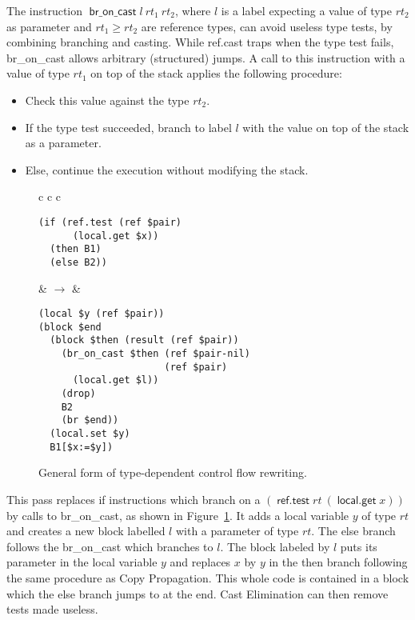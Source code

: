 \documentclass[a4paper,11pt]{article}
\DeclareMathOperator{\broncast}{\textsf{br\_on\_cast}}
\DeclareMathOperator{\reftest}{\textsf{ref.test}}
\DeclareMathOperator{\localget}{\textsf{local.get}}
\begin{document}
The instruction $\broncast l\ rt_1\ rt_2$, where $l$ is a label expecting a
value of type $rt_2$ as parameter and $rt_1\geq rt_2$ are reference types, can
avoid useless type tests, by combining branching and casting. While
\textsf{ref.cast} traps when the type test fails, \textsf{br\_on\_cast} allows
arbitrary (structured) jumps. A call to this instruction with a value of type
$rt_1$ on top of the stack applies the following procedure:
\begin{itemize}\setlength{\itemsep}{0pt}
  \item Check this value against the type $rt_2$.
  \item If the type test succeeded, branch to label $l$ with the value on top of
    the stack as a parameter.
  \item Else, continue the execution without modifying the stack.
\end{itemize}
\begin{figure}[h!]
  \centering
  \begin{tabular}{c c c}
    \begin{minipage}{\widthof{\texttt{(if (ref.test (ref \$pair)}}}
\begin{verbatim}
(if (ref.test (ref $pair)
      (local.get $x))
  (then B1)
  (else B2))
\end{verbatim}
\end{minipage}
    &
    $\rightarrow$
    &
\begin{minipage}{\widthof{\texttt{....(br\_on\_cast \$then (ref \$pair-nil)}}}
\begin{verbatim}
(local $y (ref $pair))
(block $end
  (block $then (result (ref $pair))
    (br_on_cast $then (ref $pair-nil)
                      (ref $pair)
      (local.get $l))
    (drop)
    B2
    (br $end))
  (local.set $y)
  B1[$x:=$y])
\end{verbatim}
\end{minipage}
  \end{tabular}
  \caption{General form of type-dependent control flow rewriting.}\label{br}
\end{figure}


This pass replaces \textsf{if} instructions which branch on a $(\reftest
rt\ (\localget x))$ by calls to \textsf{br\_on\_cast}, as shown in
Figure~\ref{br}. It adds a local variable $y$ of type $rt$ and creates a new
block labelled $l$ with a parameter of type $rt$. The else branch follows the
\textsf{br\_on\_cast} which branches to $l$. The block labeled by $l$ puts its
parameter in the local variable $y$ and replaces $x$ by $y$ in the then branch
following the same procedure as Copy Propagation. This whole code is contained
in a block which the else branch jumps to at the end. Cast Elimination can then
remove tests made useless.
\end{document}
